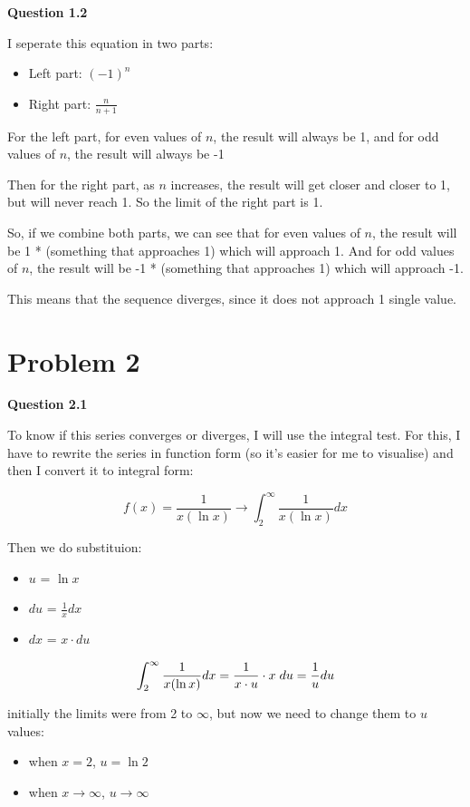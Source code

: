 \documentclass[11pt, a4paper]{article}
\begin{document}
\textbf{Question 1.2}

I seperate this equation in two parts:
\begin{itemize}
	\item Left part: ${(-1)}^n$
	\item Right part: $\frac{n}{n+1}$
\end{itemize}

For the left part, for even values of $n$, the result will always be 1, and for odd values of $n$, the result will always be -1

Then for the right part, as $n$ increases, the result will get closer and closer to 1, but will never reach 1. So the limit of the right part is 1.

So, if we combine both parts, we can see that for even values of $n$, the result will be 1 * (something that approaches 1) which will approach 1. And for odd values of $n$, the result will be -1 * (something that approaches 1) which will approach -1.

This means that the sequence diverges, since it does not approach 1 single value.


\pagebreak
\section*{Problem 2}

\textbf{Question 2.1}


To know if this series converges or diverges, I will use the integral test. For this, I have to rewrite the series in function form (so it's easier for me to visualise) and then I convert it to integral form:

\[
f(x) = \frac{1}{x(\ln x)} \rightarrow \int_{2}^{\infty} \frac{1}{x(\ln x)} dx
\]

Then we do substituion:

\begin{itemize}
	\item $u$ = $\ln x$
	\item $du$ = $\frac{1}{x} dx$
	\item $dx$ = $x \cdot du$
\end{itemize}

\[
\int_{2}^{\infty} \frac{1}{x(\ln x)} dx = \frac{1}{x \cdot u} \cdot x \hspace{0.1cm} du = \frac{1}{u} du 
\]

initially the limits were from 2 to $\infty$, but now we need to change them to $u$ values:
\begin{itemize}
	\item when $x = 2$, $u = \ln 2$
	\item when $x \rightarrow \infty$, $u \rightarrow \infty$
\end{itemize}
\end{document}
